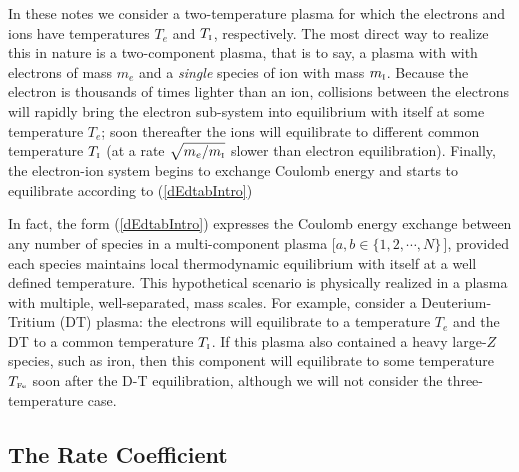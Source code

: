 \documentclass[preprint,12pt,eqsecnum,nofootinbib,amsmath,amssymb]{revtex4}
\newcommand{\smI}{{\rm\scriptscriptstyle I}}
\newcommand{\smFe}{{\rm\scriptscriptstyle Fe}}
\begin{document}
In these notes we consider a two-temperature plasma for which the
electrons and ions have temperatures $T_e$ and $T_\smI$,
respectively. The most direct way to realize this in nature is a
two-component plasma, that is to say, a plasma with with electrons of
mass $m_e$ and a {\em single} species of ion with mass
$m_\smI$. Because the electron is thousands of times lighter than an
ion, collisions between the electrons will rapidly bring the electron
sub-system into equilibrium with itself at some temperature $T_e$;
soon thereafter the ions will equilibrate to different common
temperature $T_\smI$ (at a rate $\sqrt{m_e/m_\smI}$ slower than
electron equilibration). Finally, the electron-ion system begins to
exchange Coulomb energy and starts to equilibrate according to
(\ref{dEdtabIntro})

In fact, the form (\ref{dEdtabIntro}) expresses the Coulomb energy exchange
between any number of species in a multi-component plasma [$a,b \in
\{1, 2, \cdots, N \}$\,], provided each species maintains local
thermodynamic equilibrium with itself at a well defined
temperature. This hypothetical scenario is physically realized in a
plasma with multiple, well-separated, mass scales. For example,
consider a Deuterium-Tritium (DT) plasma: the electrons will
equilibrate to a temperature $T_e$ and the DT to a common temperature
$T_\smI$. If this plasma also contained a heavy large-$Z$ species,
such as iron, then this component will equilibrate to some temperature
$T_\smFe$ soon after the D-T equilibration, although we will not
consider the three-temperature case. 

\subsection{The Rate Coefficient}
\end{document}
